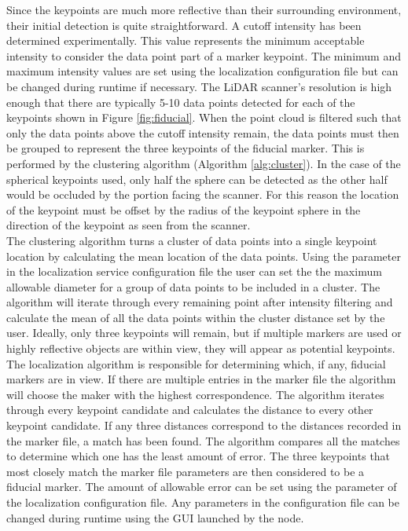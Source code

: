 Since the keypoints are much more reflective than their surrounding environment, their initial detection is quite straightforward. A cutoff intensity has been determined experimentally. This value represents the minimum acceptable intensity to consider the data point part of a marker keypoint. The minimum and maximum intensity values are set using the localization configuration file but can be changed during runtime if necessary. The LiDAR scanner's resolution is high enough that there are typically 5-10 data points detected for each of the keypoints shown in Figure \ref{fig:fiducial}. When the point cloud is filtered such that only the data points above the cutoff intensity remain, the data points must then be grouped to represent the three keypoints of the fiducial marker. This is performed by the clustering algorithm (Algorithm \ref{alg:cluster}). In the case of the spherical keypoints used, only half the sphere can be detected as the other half would be occluded by the portion facing the scanner. For this reason the location of the keypoint must be offset by the radius of the keypoint sphere in the direction of the keypoint as seen from the scanner.\\

The clustering algorithm turns a cluster of data points into a single keypoint location by calculating the mean location of the data points. Using the  parameter in the localization service configuration file the user can set the the maximum allowable diameter for a group of data points to be included in a cluster. The algorithm will iterate through every remaining point after intensity filtering and calculate the mean of all the data points within the cluster distance set by the user. Ideally, only three keypoints will remain, but if multiple markers are used or highly reflective objects are within view, they will appear as potential keypoints.\\

The localization algorithm is responsible for determining which, if any, fiducial markers are in view. If there are multiple entries in the marker file the algorithm will choose the maker with the highest correspondence. The algorithm iterates through every keypoint candidate and calculates the distance to every other keypoint candidate. If any three distances correspond to the distances recorded in the marker file, a match has been found. The algorithm compares all the matches to determine which one has the least amount of error. The three keypoints that most closely match the marker file parameters are then considered to be a fiducial marker. The amount of allowable error can be set using the  parameter of the localization configuration file. Any parameters in the configuration file can be changed during runtime using the GUI launched by the  node.\\

